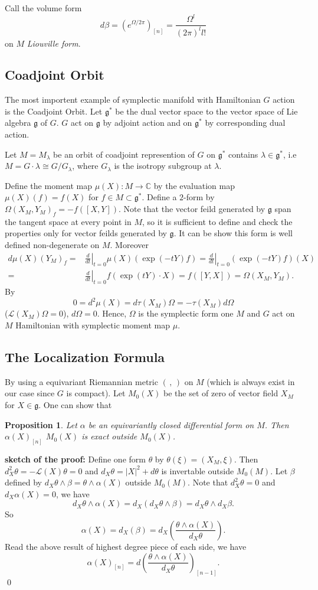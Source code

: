 \documentclass[11pt]{amsart}
\newtheorem{Prop}{Proposition}
\def\cL{{\mathcal{L}}}
\def\bC{{\mathbb{C}}}
\def\fgg{{\mathfrak{g}}}
\def\kw#1{{\em #1}}
\def\ddt{\left.\frac{d}{dt}\right|_{t=0}}
\def\sprof{{\bf sketch of the proof:}}
\begin{document}
Call the volume form 
\[
d\beta=(e^{\Omega/2\pi})_[n] = \frac{\Omega^l}{(2\pi)^ll!}
\] 
on $M$ \kw{Liouville form}.

\subsection{Coadjoint Orbit}
The most importent example of symplectic manifold with Hamiltonian $G$
action is the Coadjoint Orbit. 
Let $\fgg^*$ be the dual vector space to the vector space of Lie
algebra $\fgg$ of $G$. $G$ act on $\fgg$ by adjoint action and on
$\fgg^*$ by corresponding dual action.

Let $M=M_\lambda$ be an orbit of coadjoint represention of $G$ on
$\fgg^*$ contains $\lambda \in \fgg^*$, i.e $M = G\cdot \lambda\cong
G/G_\lambda$, where $G_\lambda$ is the isotropy subgroup at $\lambda$.

Define the moment map $\mu(X)\colon M \to \bC$ by the evaluation map
$\mu(X)(f) = f(X)$ for $f\in M \subset \fgg^*$.
Define a $2$-form by $\Omega(X_M,Y_M)_f =-
f([X,Y])$. Note that the vector feild generated by $\fgg$ span the
tangent space at every point in $M$, so it is sufficient to define and
check the properties only for vector feilds generated by $\fgg$. It can be show this form is well defined non-degenerate on
$M$.
Moreover 
\[
\begin{split}
d\mu(X)(Y_M)_f  =& \ddt \mu(X)(\exp(-tY)f) =  \ddt(\exp(-tY)f)(X) \\
=&
\ddt f(\exp(tY)\cdot X) = f([Y,X]) = \Omega(X_M,Y_M).
\end{split}
\]
By 
\[
0 = d^2\mu(X) = d\tau(X_M)\Omega = -\tau(X_M) d\Omega
\] ($\cL(X_M)\Omega=0$), $d\Omega=0$.
Hence, $\Omega$ is the symplectic form one $M$ and $G$ act on $M$
Hamiltonian with symplectic moment map $\mu$.



\subsection{The Localization Formula}
By using a equivariant Riemannian metric $(\,,\,)$ on $M$ (which is always exist
in our case since $G$ is compact). 
Let $M_0(X)$ be the set of zero of vector field $X_M$ for $X\in \fgg$.
One can show that 
\begin{Prop}
Let $\alpha$ be an equivariantly closed differential form on $M$. 
Then $\alpha(X)_{[n]}$ $M_0(X)$ is exact outside $M_0(X)$.
\end{Prop}
\sprof 
Define one form $\theta$ by $\theta(\xi) = (X_M, \xi)$. 
Then $d_X^2 \theta  = -\cL(X)\theta  = 0$ and $d_X\theta  = |X|^2 + d\theta$ is
invertable outside $M_0(M)$. 
Let $\beta$ defined by $ d_X\theta \wedge \beta = \theta \wedge \alpha(X)$ outside $M_0(M)$.
Note that $d_X^2 \theta=0$ and $d_X\alpha(X) = 0$, we have
\[
d_X\theta \wedge \alpha(X) = 
d_X(d_X\theta \wedge \beta) = d_X\theta \wedge d_X\beta.
\]
So 
\[
\alpha(X) = d_X(\beta) = d_X\left(\frac{\theta\wedge \alpha(X)}{d_X\theta}\right).
\]
Read the above result of highest degree piece of each side, we have
\[
\alpha(X)_{[n]} = d\left(\frac{\theta\wedge \alpha(X)}{d_X\theta}\right)_{[n-1]}.
\] \qed
\end{document}
